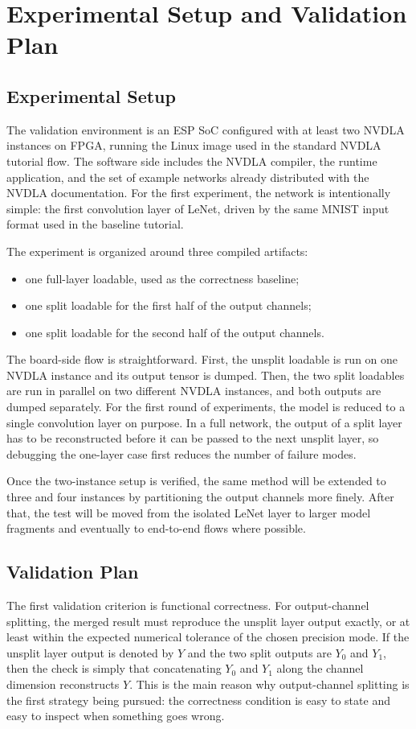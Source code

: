 \documentclass[10pt,sigconf,nonacm]{acmart}
\begin{document}
\section{Experimental Setup and Validation Plan}
\label{sec:setup}

\subsection{Experimental Setup}
The validation environment is an ESP SoC configured with at least two NVDLA instances on FPGA, running the Linux image used in the standard NVDLA tutorial flow. The software side includes the NVDLA compiler, the runtime application, and the set of example networks already distributed with the NVDLA documentation. For the first experiment, the network is intentionally simple: the first convolution layer of LeNet, driven by the same MNIST input format used in the baseline tutorial.

The experiment is organized around three compiled artifacts:
\begin{itemize}
    \item one full-layer loadable, used as the correctness baseline;
    \item one split loadable for the first half of the output channels;
    \item one split loadable for the second half of the output channels.
\end{itemize}

The board-side flow is straightforward. First, the unsplit loadable is run on one NVDLA instance and its output tensor is dumped. Then, the two split loadables are run in parallel on two different NVDLA instances, and both outputs are dumped separately. For the first round of experiments, the model is reduced to a single convolution layer on purpose. In a full network, the output of a split layer has to be reconstructed before it can be passed to the next unsplit layer, so debugging the one-layer case first reduces the number of failure modes.

Once the two-instance setup is verified, the same method will be extended to three and four instances by partitioning the output channels more finely. After that, the test will be moved from the isolated LeNet layer to larger model fragments and eventually to end-to-end flows where possible.

\subsection{Validation Plan}
The first validation criterion is functional correctness. For output-channel splitting, the merged result must reproduce the unsplit layer output exactly, or at least within the expected numerical tolerance of the chosen precision mode. If the unsplit layer output is denoted by $Y$ and the two split outputs are $Y_0$ and $Y_1$, then the check is simply that concatenating $Y_0$ and $Y_1$ along the channel dimension reconstructs $Y$. This is the main reason why output-channel splitting is the first strategy being pursued: the correctness condition is easy to state and easy to inspect when something goes wrong.
\end{document}
